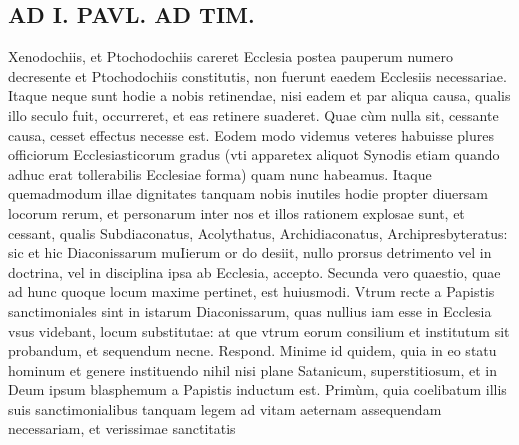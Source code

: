 \documentclass{article}
\begin{document}
\begin{pages}
\section*{AD I. PAVL. AD TIM. }
\marginpar{[ p.290 ]}\pstart Xenodochiis, et Ptochodochiis careret Ecclesia postea pauperum numero decresente et Ptochodochiis constitutis, non fuerunt eaedem Ecclesiis necessariae. Itaque neque sunt hodie a nobis retinendae, nisi eadem et par aliqua causa, qualis illo seculo fuit, occurreret, et eas retinere suaderet. Quae cùm nulla sit, cessante causa, cesset effectus necesse est. Eodem modo videmus veteres habuisse plures officiorum Ecclesiasticorum gradus (vti apparetex aliquot Synodis etiam quando adhuc erat tollerabilis Ecclesiae forma) quam nunc habeamus. Itaque quemadmodum illae dignitates tanquam nobis inutiles hodie propter diuersam locorum rerum, et personarum inter nos et illos rationem explosae sunt, et cessant, qualis Subdiaconatus, Acolythatus, Archidiaconatus, Archipresbyteratus: sic et hic Diaconissarum muIierum or do desiit, nullo prorsus detrimento vel in doctrina, vel in disciplina ipsa ab Ecclesia, accepto.  \pend\pstart Secunda vero quaestio, quae ad hunc quoque locum maxime pertinet, est huiusmodi. Vtrum recte a Papistis sanctimoniales sint in istarum Diaconissarum, quas nullius iam esse in Ecclesia vsus videbant, locum substitutae: at que vtrum eorum consilium et institutum sit probandum, et sequendum necne. Respond. Minime id quidem, quia in eo statu hominum et genere instituendo nihil nisi plane Satanicum, superstitiosum, et in Deum ipsum blasphemum a Papistis inductum est. Primùm, quia coelibatum illis suis sanctimonialibus tanquam legem ad vitam aeternam assequendam necessariam, et verissimae sanctitatis  \pend

\end{pages}
\end{document}
